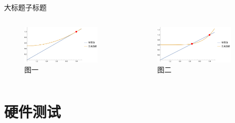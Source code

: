 \documentclass[8pt]{ctexbeamer}
\begin{document}
\begin{frame}{大标题}{子标题}
	\begin{columns}
		\begin{column}{0.5\textwidth}
			\begin{figure}
				\centering
					\includegraphics[width=0.9\textwidth]{figure/P1.png}
					\caption{图一}
			\end{figure}
		\end{column}
		\begin{column}{0.5\textwidth}
			\begin{figure}
			\centering
				\includegraphics[width=0.9\textwidth]{figure/P2.png}
				\caption{图二}
			\end{figure}
		\end{column}
		\end{columns}
\end{frame}


\section{硬件测试}
\end{document}
